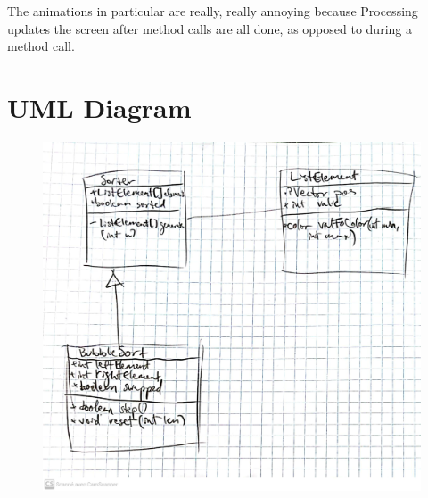 \documentclass{scrartcl}
\begin{document}
The animations in particular are really, really annoying because
Processing updates the screen after method calls are all done,
as opposed to during a method call.

\section{UML Diagram}
\begin{figure}[h]
	\centering
	\includegraphics[width=0.8\linewidth]{UML_v3}
\end{figure}
\end{document}
